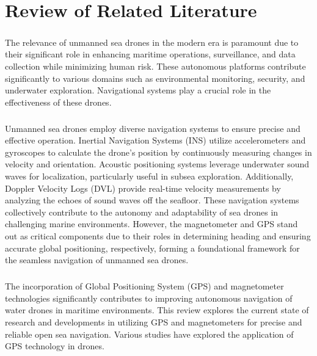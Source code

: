 \chapter{Review of Related Literature}

\paragraph{} The relevance of unmanned sea drones in the modern era is paramount due to their significant role in enhancing maritime 
            operations, surveillance, and data collection while minimizing human risk. These autonomous platforms contribute 
            significantly to various domains such as environmental monitoring, security, and underwater exploration. Navigational 
            systems play a crucial role in the effectiveness of these drones.

\paragraph{} Unmanned sea drones employ diverse navigation systems to ensure precise and effective operation. Inertial Navigation 
            Systems (INS) utilize accelerometers and gyroscopes to calculate the drone's position by continuously measuring changes 
            in velocity and orientation. Acoustic positioning systems leverage underwater sound waves for localization, particularly 
            useful in subsea exploration. Additionally, Doppler Velocity Logs (DVL) provide real-time velocity measurements by 
            analyzing the echoes of sound waves off the seafloor. These navigation systems collectively contribute to the autonomy 
            and adaptability of sea drones in challenging marine environments. However, the magnetometer and GPS stand out as critical 
            components due to their roles in determining heading and ensuring accurate global positioning, respectively, forming a 
            foundational framework for the seamless navigation of unmanned sea drones.

\paragraph{} The incorporation of Global Positioning System (GPS) and magnetometer technologies significantly contributes to improving
            autonomous navigation of water drones in maritime environments. This review explores the current state of research and 
            developments in utilizing GPS and magnetometers for precise and reliable open sea navigation. Various studies have explored 
            the application of GPS technology in drones.

